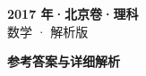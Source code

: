 \documentclass[zihao=-4, a4paper]{ctexart}
\begin{document}
\begin{center}
  {\Large\bfseries 2017 年·北京卷·理科}\\[4pt]
  {\large 数学 · 解析版}
\end{center}
\medskip
{}

\clearpage
{}
\begin{center}{\Large\bfseries 参考答案与详细解析}\end{center}
\medskip

\end{document}
